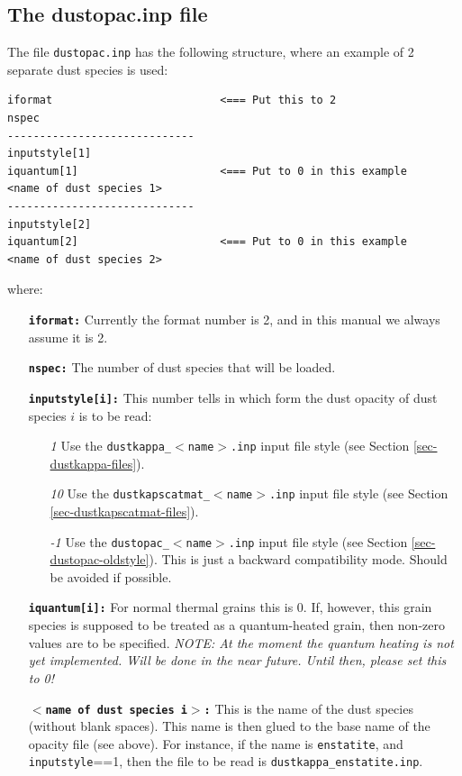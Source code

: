 \documentclass{report}
\newenvironment{asciibox}%
  {\begin{list}{}{%
    \setlength{\topsep}{0.5em}%
    \setlength{\parskip}{0em}%
    \setlength{\parsep}{0em}%
    \setlength{\itemsep}{0em}%
    \setlength{\rightmargin}{0em}%
    \setlength{\leftmargin}{3.0em}%
    \setlength{\labelsep}{1em}%
    \setlength{\labelwidth}{2em}%
  }\normalfont\footnotesize\item}
  {\end{list}}
\begin{document}
\subsection{The dustopac.inp file}\label{sec-dustopac-inp-file}
The file {\small\tt dustopac.inp} has the following structure, where an example
of 2 separate dust species is used:
\begin{asciibox}\begin{verbatim}
iformat                          <=== Put this to 2
nspec
-----------------------------
inputstyle[1]
iquantum[1]                      <=== Put to 0 in this example
<name of dust species 1>
-----------------------------
inputstyle[2]
iquantum[2]                      <=== Put to 0 in this example
<name of dust species 2>
\end{verbatim}\end{asciibox}
where:
\begin{itemize}
\item[] {\small\tt\bf iformat:} Currently the format number is 2, and in this manual
  we always assume it is 2.
\item[] {\small\tt\bf nspec:} The number of dust species that will be loaded.
\item[] {\small\tt\bf inputstyle[i]:} This number tells in which form the dust
  opacity of dust species $i$ is to be read:
  \begin{itemize}
  \item[{\em 1}] Use the {\small\tt dustkappa\_$<$name$>$.inp} input file
    style (see Section \ref{sec-dustkappa-files}). 
  \item[{\em 10}] Use the {\small\tt dustkapscatmat\_$<$name$>$.inp} input
    file style (see Section \ref{sec-dustkapscatmat-files}).
  \item[{\em -1}] Use the {\small\tt dustopac\_$<$name$>$.inp} input file
    style (see Section \ref{sec-dustopac-oldstyle}). This is just a backward
    compatibility mode. Should be avoided if possible.
  \end{itemize}
\item[] {\small\tt\bf iquantum[i]:} For normal thermal grains this is 0. If,
  however, this grain species is supposed to be treated as a quantum-heated
  grain, then non-zero values are to be specified. {\em NOTE: At the moment
    the quantum heating is not yet implemented. Will be done in the near
    future. Until then, please set this to 0!}
\item[] {\small\tt\bf $<$name of dust species i$>$:} This is the name of the
  dust species (without blank spaces). This name is then glued to the base
  name of the opacity file (see above). For instance, if the name is
  {\small\tt enstatite}, and {\small\tt inputstyle}==1, then the file to be
  read is {\small\tt dustkappa\_enstatite.inp}.
\end{itemize}
\end{document}
